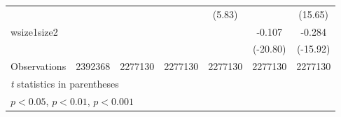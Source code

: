 {\begin{tabular}{l*{6}{c}}
                    &                     &                     &                     &      (5.83)         &                     &     (15.65)         \\
[1em]
wsize1size2         &                     &                     &                     &                     &      -0.107\sym{***}&      -0.284\sym{***}\\
                    &                     &                     &                     &                     &    (-20.80)         &    (-15.92)         \\
\hline
Observations        &     2392368         &     2277130         &     2277130         &     2277130         &     2277130         &     2277130         \\
\hline\hline
\multicolumn{7}{l}{\footnotesize \textit{t} statistics in parentheses}\\
\multicolumn{7}{l}{\footnotesize \sym{*} \(p<0.05\), \sym{**} \(p<0.01\), \sym{***} \(p<0.001\)}\\
\end{tabular}
}
